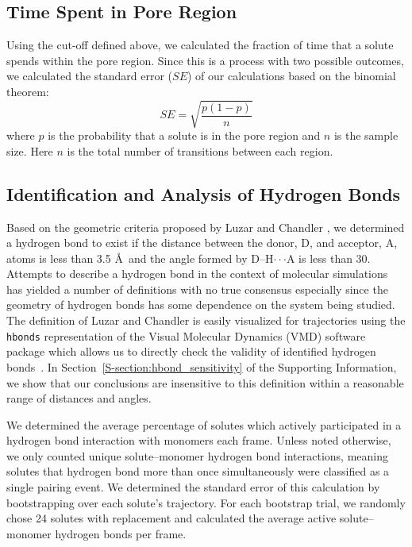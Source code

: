 \documentclass[journal=jpcbfk,manuscript=article]{achemso}
\begin{document}
  \subsection{Time Spent in Pore Region}
  
  Using the cut-off defined above, we calculated the fraction of time
  that a solute spends within the pore region. Since this is a process
  with two possible outcomes, we calculated the standard error ($SE$) of our
  calculations based on the binomial theorem: 
  \begin{equation}
  SE = \sqrt{\dfrac{p(1-p)}{n}}
  \end{equation}
  where $p$ is the probability that a solute is in the pore region and
  $n$ is the sample size. Here $n$ is the total number of transitions
  between each region. 
  
  \subsection{Identification and Analysis of Hydrogen Bonds}\label{method:hbonds}  %

  Based on the geometric criteria proposed by Luzar and Chandler 
  \cite{luzar_effect_1996}, we determined a hydrogen bond to exist if the
  distance between the donor, D, and acceptor, A, atoms is less than 
  3.5 \AA~and the angle formed by D--H$\cdot\cdot\cdot$A is less than 30\degree. Attempts
  to describe a hydrogen bond in the context of molecular simulations has
  yielded a number of definitions with no true consensus 
  \cite{prada-gracia_quest_2013} especially since the geometry of hydrogen
  bonds has some dependence on the system being studied. The definition of
  Luzar and Chandler is easily visualized for trajectories using the 
  \texttt{hbonds} representation of the Visual Molecular Dynamics (VMD) software 
  package which allows us to directly check the validity of identified hydrogen 
  bonds~\cite{humphrey_VMD:_1996}. In Section~\ref{S-section:hbond_sensitivity} 
  of the Supporting Information, we show that our conclusions are insensitive
  to this definition within a reasonable range of distances and angles. 
  
  We determined the average percentage of solutes
  which actively participated in a hydrogen bond interaction with monomers 
  each frame. Unless noted otherwise, we only counted unique solute--monomer
  hydrogen bond interactions, meaning solutes that hydrogen bond more than 
  once simultaneously were classified as a single pairing event. We determined
  the standard error of this calculation by bootstrapping over each solute's 
  trajectory. For each bootstrap trial, we randomly chose 24 solutes with 
  replacement and calculated the average active solute--monomer hydrogen bonds per frame.
\end{document}

